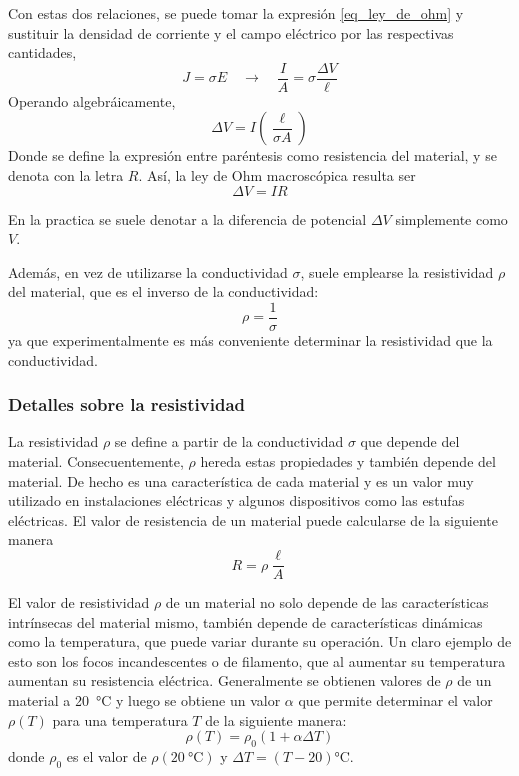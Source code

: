 Con estas dos relaciones, se puede tomar la expresión \eqref{eq_ley_de_ohm} y sustituir la densidad de corriente y el campo eléctrico por las respectivas cantidades,
\[
  J=\sigma E \quad \rightarrow \quad \frac{I}{A}=\sigma \frac{\Delta V}{\ell}
\]
Operando algebráicamente,
\[
  \Delta V = I \left(\frac{\ell}{\sigma A}\right)
\]
Donde se define la expresión entre paréntesis como resistencia del material, y se denota con la letra \(R\). Así, la ley de Ohm macroscópica resulta ser 
\[
  \Delta V = IR
\]
\begin{tcolorbox}[myconclusion]
  En la practica se suele denotar a la diferencia de potencial \(\Delta V\) simplemente como \(V\).

  Además, en vez de utilizarse la conductividad \(\sigma\), suele emplearse la resistividad \(\rho\) del material, que es el inverso de la conductividad:
  \[
    \rho = \frac{1}{\sigma}
  \]
  ya que experimentalmente es más conveniente determinar la resistividad que la conductividad.
\end{tcolorbox}

\subsubsection{Detalles sobre la resistividad}

La resistividad \(\rho\) se define a partir de la conductividad \(\sigma\) que depende del material. Consecuentemente, \(\rho\) hereda estas propiedades y también depende del material. De hecho es una característica de cada material y es un valor muy utilizado en instalaciones eléctricas y algunos dispositivos como las estufas eléctricas. El valor de resistencia de un material puede calcularse de la siguiente manera
\[
  R=\rho\frac{\ell}{A}
\]

El valor de resistividad \(\rho\) de un material no solo depende de las características intrínsecas del material mismo, también depende de características dinámicas como la temperatura, que puede variar durante su operación. Un claro ejemplo de esto son los focos incandescentes o de filamento, que al aumentar su temperatura aumentan su resistencia eléctrica. Generalmente se obtienen valores de \(\rho\) de un material a \qty{20}{\degreeCelsius} y luego se obtiene un valor \(\alpha\) que permite determinar el valor \(\rho(T)\) para una temperatura \(T\) de la siguiente manera:
\[
  \rho(T)=\rho_0 (1+\alpha\Delta T)
\]
donde \(\rho_0\) es el valor de \(\rho(\qty{20}{\degreeCelsius})\) y \(\Delta T = (T-20)\unit{\degreeCelsius}\). 

